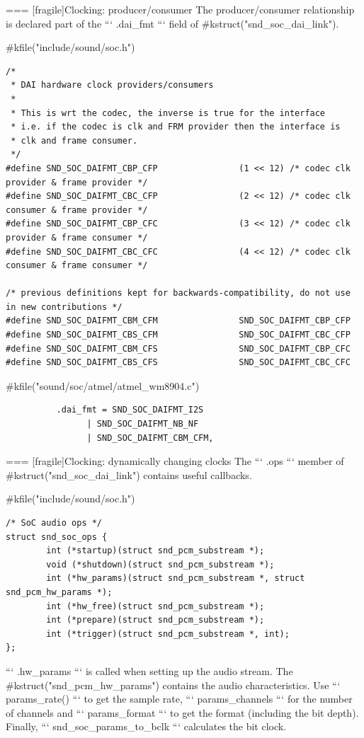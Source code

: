 === [fragile]{Clocking: producer/consumer}
  The producer/consumer relationship is declared part of the
  ``` .dai_fmt ``` field of #kstruct("snd_soc_dai_link").
  \begin{block}{#kfile("include/sound/soc.h")}
    \fontsize{6}{6}\selectfont
    \begin{verbatim}
/*
 * DAI hardware clock providers/consumers
 *
 * This is wrt the codec, the inverse is true for the interface
 * i.e. if the codec is clk and FRM provider then the interface is
 * clk and frame consumer.
 */
#define SND_SOC_DAIFMT_CBP_CFP                (1 << 12) /* codec clk provider & frame provider */
#define SND_SOC_DAIFMT_CBC_CFP                (2 << 12) /* codec clk consumer & frame provider */
#define SND_SOC_DAIFMT_CBP_CFC                (3 << 12) /* codec clk provider & frame consumer */
#define SND_SOC_DAIFMT_CBC_CFC                (4 << 12) /* codec clk consumer & frame consumer */

/* previous definitions kept for backwards-compatibility, do not use in new contributions */
#define SND_SOC_DAIFMT_CBM_CFM                SND_SOC_DAIFMT_CBP_CFP
#define SND_SOC_DAIFMT_CBS_CFM                SND_SOC_DAIFMT_CBC_CFP
#define SND_SOC_DAIFMT_CBM_CFS                SND_SOC_DAIFMT_CBP_CFC
#define SND_SOC_DAIFMT_CBS_CFS                SND_SOC_DAIFMT_CBC_CFC
    \end{verbatim}
  \end{block}
  \begin{block}{#kfile("sound/soc/atmel/atmel_wm8904.c")}
    \fontsize{9}{9}\selectfont
    \begin{verbatim}
          .dai_fmt = SND_SOC_DAIFMT_I2S
                | SND_SOC_DAIFMT_NB_NF
                | SND_SOC_DAIFMT_CBM_CFM,
    \end{verbatim}
  \end{block}


=== [fragile]{Clocking: dynamically changing clocks}
  The ``` .ops ``` member of #kstruct("snd_soc_dai_link") contains
  useful callbacks.
  \begin{block}{#kfile("include/sound/soc.h")}
    \fontsize{10}{10}\selectfont
    \begin{verbatim}
/* SoC audio ops */
struct snd_soc_ops {
        int (*startup)(struct snd_pcm_substream *);
        void (*shutdown)(struct snd_pcm_substream *);
        int (*hw_params)(struct snd_pcm_substream *, struct snd_pcm_hw_params *);
        int (*hw_free)(struct snd_pcm_substream *);
        int (*prepare)(struct snd_pcm_substream *);
        int (*trigger)(struct snd_pcm_substream *, int);
};
    \end{verbatim}
  \end{block}
  ``` .hw_params ``` is called when setting up the audio stream. The
  #kstruct("snd_pcm_hw_params") contains the audio characteristics.
  Use ``` params_rate() ``` to get the sample rate,
  ``` params_channels ``` for the number of channels and
  ``` params_format ``` to get the format (including the bit depth).
  Finally, ``` snd_soc_params_to_bclk ``` calculates the bit clock.


